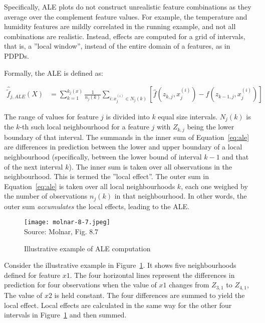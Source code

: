 Specifically, ALE plots do not construct unrealistic feature combinations as they average over the complement feature values. For example, the temperature and humidity features are mildly correlated in the running example, and not all combinations are realistic. Instead, effects are computed for a grid of intervals, that is, a ''local window'', instead of the entire domain of a features, as in PDPDs.

Formally, the ALE is defined as:

\begin{align}
\hat{\tilde{f}}_{j, ALE}(X) &= \sum_{k=1}^{k_j(x)} \frac{1}{n_j(k)} \sum_{i:x_j^{(i)} \in N_j(k)} \left[\hat{f}(z_{k, j}, x^{(i)}_j) - \hat{f} (z_{k-1, j},x^{(i)}_j) \right] \label{eq:ale}
\end{align}

The range of values for feature $j$ is divided into $k$ equal size intervals. $N_j(k)$ is the $k$-th such local neighbourhood for a feature $j$ with $Z_{k,j}$ being the lower boundary of that interval. The summands in the inner sum of Equation~\ref{eq:ale} are differences in prediction between the lower and upper boundary of a local neighbourhood (specifically, between the lower bound of interval $k-1$ and that of the next interval $k$). The inner sum is taken over all observations in the neighbourhood. This is termed the ''local effect''. The outer sum in Equation~\ref{eq:ale} is taken over all local neighbourhoods $k$, each one weighed by the number of observations $n_j(k)$ in that neighbourhood. In other words, the outer sum \emph{accumulates} the local effects, leading to the ALE.

\begin{figure}
\centering
\texttt{[image: molnar-8-7.jpeg]} \\

\scriptsize Source: Molnar, Fig. 8.7
\caption{Illustrative example of ALE computation}
\label{fig:molnar87}
\end{figure}

Consider the illustrative example in Figure~\ref{fig:molnar87}. It shows five neighbourhoods defined for feature $x1$. The four horizontal lines represent the differences in prediction for four observations when the value of $x1$ changes from $Z_{3,1}$ to $Z_{4,1}$, The value of $x2$ is held constant. The four differences are summed to yield the local effect. Local effects are calculated in the same way for the other four intervals in Figure~\ref{fig:molnar87} and then summed. 

